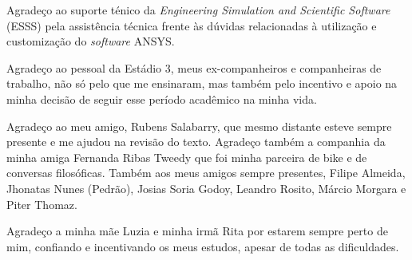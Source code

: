 Agradeço ao suporte ténico da \textit{Engineering Simulation and Scientific Software} (ESSS) pela assistência técnica frente às dúvidas relacionadas à utilização e customização do \textit{software} ANSYS.

Agradeço ao pessoal da Estádio 3, meus ex-companheiros e companheiras de trabalho, não só pelo que me ensinaram, mas também pelo incentivo e apoio na minha decisão de seguir esse período acadêmico na minha vida.

Agradeço ao meu amigo, Rubens Salabarry, que mesmo distante esteve sempre presente e me ajudou na revisão do texto. Agradeço também a companhia da minha amiga Fernanda Ribas Tweedy que foi minha parceira de bike e de conversas filosóficas. Também aos meus amigos sempre presentes, Filipe Almeida, Jhonatas Nunes (Pedrão), Josias Soria Godoy, Leandro Rosito, Márcio Morgara e Piter Thomaz. 

Agradeço a minha mãe Luzia e minha irmã Rita por estarem sempre perto de mim, confiando e incentivando os meus estudos, apesar de todas as dificuldades.